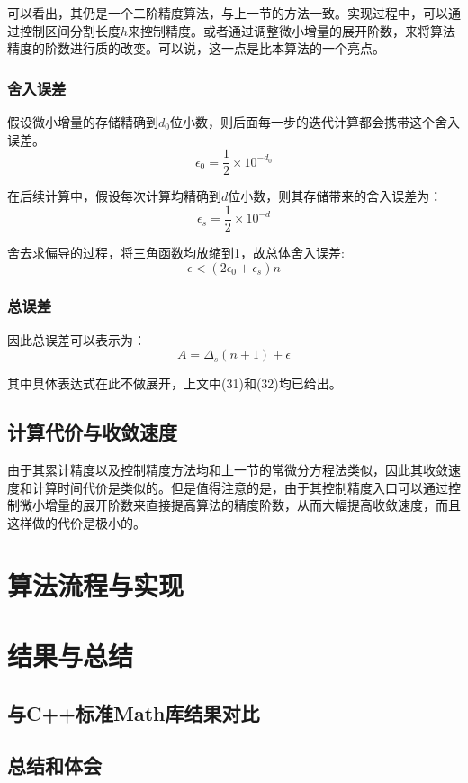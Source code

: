 \documentclass[UTF8]{ctexart}
\begin{document}
可以看出，其仍是一个二阶精度算法，与上一节的方法一致。实现过程中，可以通过控制区间分割长度$h$来控制精度。或者通过调整微小增量的展开阶数，来将算法精度的阶数进行质的改变。可以说，这一点是比本算法的一个亮点。

\subsubsection{舍入误差}

假设微小增量的存储精确到$d_0$位小数，则后面每一步的迭代计算都会携带这个舍入误差。$$\epsilon_0 = \frac{1}{2}\times 10^{-d_0}$$

在后续计算中，假设每次计算均精确到$d$位小数，则其存储带来的舍入误差为：$$\epsilon_s = \frac{1}{2}\times 10^{-d}$$

舍去求偏导的过程，将三角函数均放缩到1，故总体舍入误差:
\begin{equation}
    \epsilon < (2\epsilon_0+\epsilon_s)n
\end{equation}

\subsubsection{总误差}

因此总误差可以表示为：
\begin{equation}
    A = \Delta_s(n+1) +\epsilon
\end{equation}

其中具体表达式在此不做展开，上文中(31)和(32)均已给出。


\subsection{计算代价与收敛速度}

由于其累计精度以及控制精度方法均和上一节的常微分方程法类似，因此其收敛速度和计算时间代价是类似的。但是值得注意的是，由于其控制精度入口可以通过控制微小增量的展开阶数来直接提高算法的精度阶数，从而大幅提高收敛速度，而且这样做的代价是极小的。
\section{算法流程与实现}



\section{结果与总结}

\subsection{与C++标准Math库结果对比}

\subsection{总结和体会}
\end{document}
